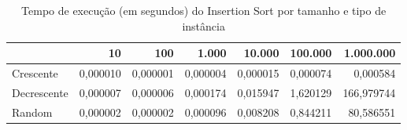 \begin{table}[htbp]
    \centering
    \begin{tabular}{|l|r|r|r|r|r|r|}
        \hline
         & 10 & 100 & 1.000 & 10.000 & 100.000 & 1.000.000 \\
        \hline
        Crescente & 0,000010 & 0,000001 & 0,000004 & 0,000015 & 0,000074 & 0,000584 \\
        \hline
        Decrescente & 0,000007 & 0,000006 & 0,000174 & 0,015947 & 1,620129 & 166,979744 \\
        \hline
        Random & 0,000002 & 0,000002 & 0,000096 & 0,008208 & 0,844211 & 80,586551 \\
        \hline
    \end{tabular}
    \caption{Tempo de execução (em segundos) do Insertion Sort por tamanho e tipo de instância}
    \label{tab:tempos_insertion}
\end{table}

